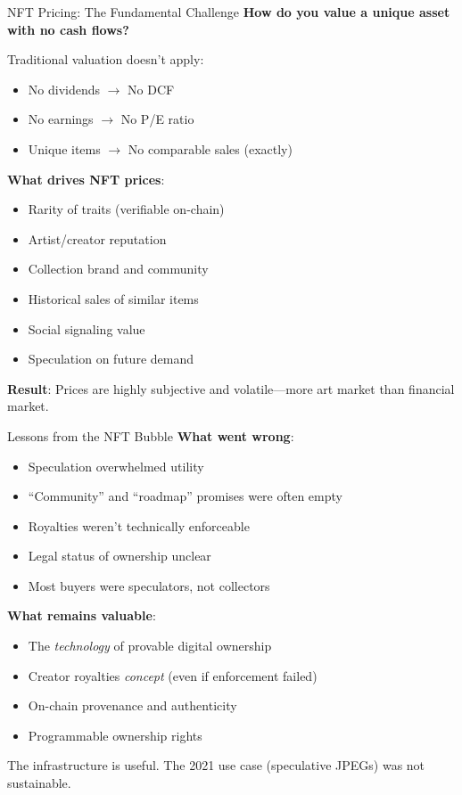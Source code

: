 \documentclass[10pt]{beamer}
\begin{document}
\begin{frame}{NFT Pricing: The Fundamental Challenge}
  \textbf{How do you value a unique asset with no cash flows?}
  
  \vspace{1em}
  Traditional valuation doesn't apply:
  \begin{itemize}
    \item No dividends $\rightarrow$ No DCF
    \item No earnings $\rightarrow$ No P/E ratio
    \item Unique items $\rightarrow$ No comparable sales (exactly)
  \end{itemize}
  
  \vspace{1em}
  \textbf{What drives NFT prices}:
  \begin{itemize}
    \item Rarity of traits (verifiable on-chain)
    \item Artist/creator reputation
    \item Collection brand and community
    \item Historical sales of similar items
    \item Social signaling value
    \item Speculation on future demand
  \end{itemize}
  
  \vspace{0.5em}
  \textbf{Result}: Prices are highly subjective and volatile---more art market than financial market.
\end{frame}

\begin{frame}{Lessons from the NFT Bubble}
  \textbf{What went wrong}:
  \begin{itemize}
    \item Speculation overwhelmed utility
    \item ``Community'' and ``roadmap'' promises were often empty
    \item Royalties weren't technically enforceable
    \item Legal status of ownership unclear
    \item Most buyers were speculators, not collectors
  \end{itemize}
  
  \vspace{1em}
  \textbf{What remains valuable}:
  \begin{itemize}
    \item The \textit{technology} of provable digital ownership
    \item Creator royalties \textit{concept} (even if enforcement failed)
    \item On-chain provenance and authenticity
    \item Programmable ownership rights
  \end{itemize}
  
  \vspace{0.5em}
  The infrastructure is useful. The 2021 use case (speculative JPEGs) was not sustainable.
\end{frame}
\end{document}
